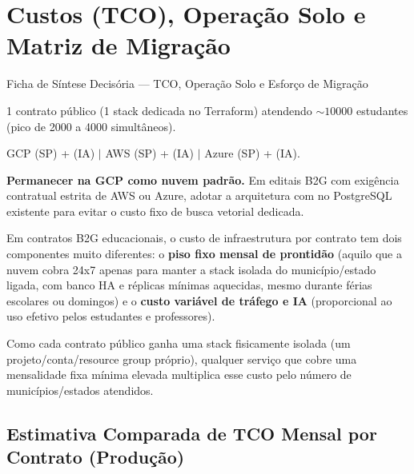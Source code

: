 \chapter{Custos (TCO), Operação Solo e Matriz de Migração}
\label{cap:custos-migracao}

\begin{fichaeixo}{Ficha de Síntese Decisória --- TCO, Operação Solo e Esforço de Migração}
\begin{campos}
  \item[Unidade econômica] 1 contrato público (1 stack dedicada no Terraform) atendendo $\sim \num{10000}$ estudantes (pico de \num{2000} a \num{4000} simultâneos).
  \item[Regiões de referência] GCP  (SP) +  (IA) $\mid$ AWS  (SP) +  (IA) $\mid$ Azure  (SP) +  (IA).
  \item[Recomendação executiva] \textbf{Permanecer na GCP como nuvem padrão.} Em editais B2G com exigência contratual estrita de AWS ou Azure, adotar a arquitetura com  no PostgreSQL existente para evitar o custo fixo de busca vetorial dedicada.
\end{campos}
\end{fichaeixo}

Em contratos B2G educacionais, o custo de infraestrutura por contrato tem dois componentes muito diferentes: o \textbf{piso fixo mensal de prontidão} (aquilo que a nuvem cobra 24x7 apenas para manter a stack isolada do município/estado ligada, com banco HA e réplicas mínimas aquecidas, mesmo durante férias escolares ou domingos) e o \textbf{custo variável de tráfego e IA} (proporcional ao uso efetivo pelos estudantes e professores).

Como cada contrato público ganha uma stack fisicamente isolada (um projeto/conta/resource group próprio), qualquer serviço que cobre uma mensalidade fixa mínima elevada multiplica esse custo pelo número de municípios/estados atendidos.

\section{Estimativa Comparada de TCO Mensal por Contrato (Produção)}
\label{sec:tco-mensal}

